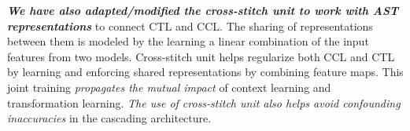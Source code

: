 {\bf {\em We have also adapted/modified the cross-stitch
    unit \cite{misra2016cross} to work with AST representations}} to
connect CTL and CCL. The sharing of representations between them is
modeled by the learning a linear combination of the input features
from two models. Cross-stitch unit helps regularize both CCL and CTL
by learning and enforcing shared representations by combining feature
maps. This joint training {\em propagates the mutual impact} of
context learning and transformation learning. {\em The use of
  cross-stitch unit also helps avoid confounding inaccuracies} in the
cascading architecture.

